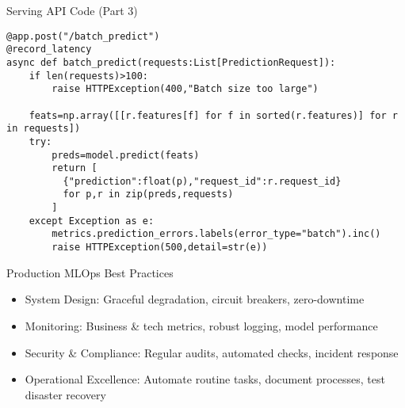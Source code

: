 \documentclass[aspectratio=169]{beamer}
\begin{document}


\begin{frame}[fragile]{Serving API Code (Part 3)}
\begin{verbatim}
@app.post("/batch_predict")
@record_latency
async def batch_predict(requests:List[PredictionRequest]):
    if len(requests)>100:
        raise HTTPException(400,"Batch size too large")

    feats=np.array([[r.features[f] for f in sorted(r.features)] for r in requests])
    try:
        preds=model.predict(feats)
        return [
          {"prediction":float(p),"request_id":r.request_id}
          for p,r in zip(preds,requests)
        ]
    except Exception as e:
        metrics.prediction_errors.labels(error_type="batch").inc()
        raise HTTPException(500,detail=str(e))
\end{verbatim}
\end{frame}



\begin{frame}{Production MLOps Best Practices}


\begin{itemize}
\item System Design: Graceful degradation, circuit breakers, zero-downtime
\item Monitoring: Business \& tech metrics, robust logging, model performance
\item Security \& Compliance: Regular audits, automated checks, incident response
\item Operational Excellence: Automate routine tasks, document processes, test disaster recovery
\end{itemize}
\end{frame}
\end{document}
